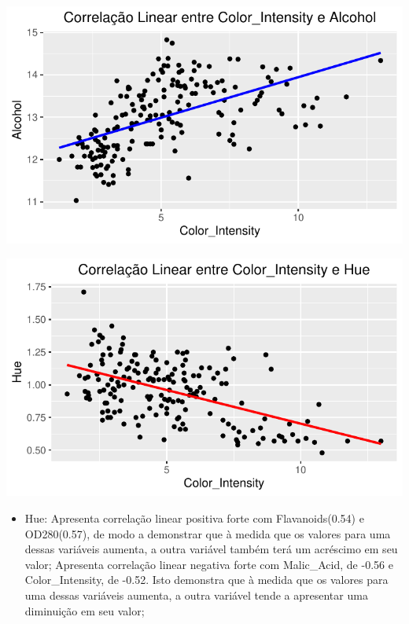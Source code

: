\documentclass[
  letterpaper,
  DIV=11,
  numbers=noendperiod]{scrartcl}
\providecommand{\tightlist}{%
  \setlength{\itemsep}{0pt}\setlength{\parskip}{0pt}}\usepackage{longtable,booktabs,array}
\begin{document}
\begin{center}
\includegraphics{wines_analysis_files/figure-pdf/unnamed-chunk-14-1.pdf}
\end{center}

\begin{center}
\includegraphics{wines_analysis_files/figure-pdf/unnamed-chunk-14-2.pdf}
\end{center}

\begin{itemize}
\tightlist
\item
  Hue: Apresenta correlação linear positiva forte com Flavanoids(0.54) e
  OD280(0.57), de modo a demonstrar que à medida que os valores para uma
  dessas variáveis aumenta, a outra variável também terá um acréscimo em
  seu valor; Apresenta correlação linear negativa forte com Malic\_Acid,
  de -0.56 e Color\_Intensity, de -0.52. Isto demonstra que à medida que
  os valores para uma dessas variáveis aumenta, a outra variável tende a
  apresentar uma diminuição em seu valor;
\end{itemize}
\end{document}
